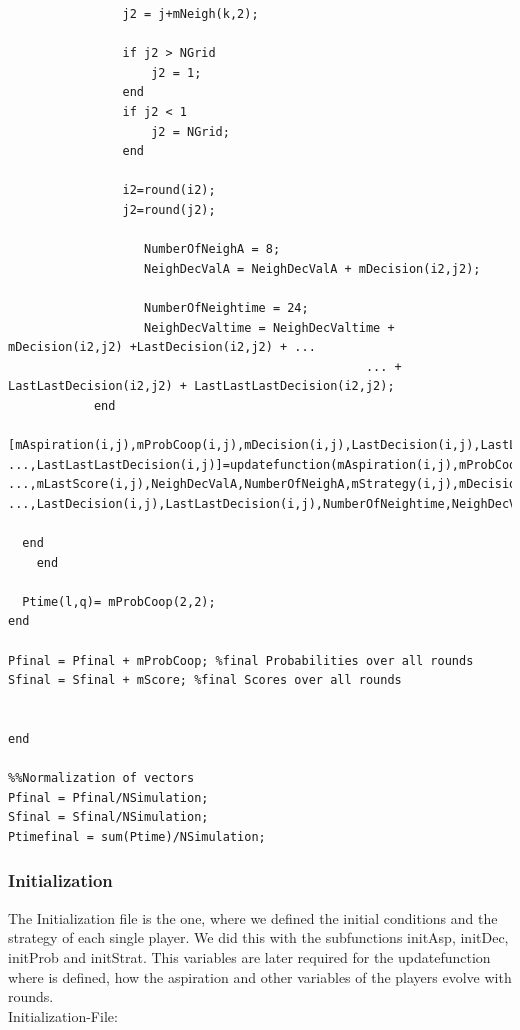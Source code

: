 \documentclass[11pt]{article}
\begin{document}
\begin{verbatim}
                j2 = j+mNeigh(k,2);
                
                if j2 > NGrid
                    j2 = 1;
                end
                if j2 < 1
                    j2 = NGrid;
                end
                
                i2=round(i2);
                j2=round(j2);
              
                   NumberOfNeighA = 8;  
                   NeighDecValA = NeighDecValA + mDecision(i2,j2); 
                   
                   NumberOfNeightime = 24;
                   NeighDecValtime = NeighDecValtime + mDecision(i2,j2) +LastDecision(i2,j2) + ...
                                                  ... + LastLastDecision(i2,j2) + LastLastLastDecision(i2,j2);
            end
 [mAspiration(i,j),mProbCoop(i,j),mDecision(i,j),LastDecision(i,j),LastLastDecision(i,j),...
...,LastLastLastDecision(i,j)]=updatefunction(mAspiration(i,j),mProbCoop(i,j),...,
...,mLastScore(i,j),NeighDecValA,NumberOfNeighA,mStrategy(i,j),mDecision(i,j),...
...,LastDecision(i,j),LastLastDecision(i,j),NumberOfNeightime,NeighDecValtime);
      
  end
    end
    
  Ptime(l,q)= mProbCoop(2,2);  
end
   
Pfinal = Pfinal + mProbCoop; %final Probabilities over all rounds
Sfinal = Sfinal + mScore; %final Scores over all rounds


end

%%Normalization of vectors
Pfinal = Pfinal/NSimulation;
Sfinal = Sfinal/NSimulation;
Ptimefinal = sum(Ptime)/NSimulation;
\end{verbatim}

\subsubsection{Initialization}

The Initialization file is the one, where we defined the initial conditions and the strategy of each single player. We did this with the subfunctions initAsp, initDec, initProb and initStrat. This variables are later required for the updatefunction where is defined, how the aspiration and other variables of the players evolve with rounds.
\\Initialization-File:
\end{document}
